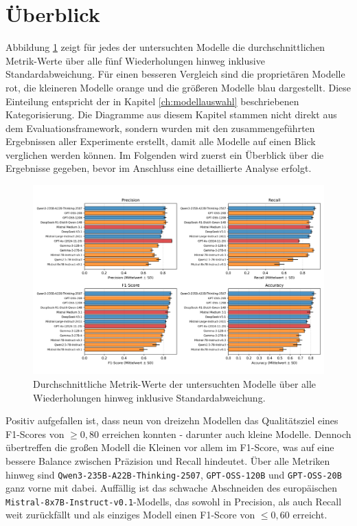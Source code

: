 \section{Überblick}\label{sec:analyse}

Abbildung \ref{fig:results-evaluation-metrics-comparison} zeigt für jedes der untersuchten Modelle die durchschnittlichen Metrik-Werte über alle fünf Wiederholungen hinweg inklusive Standardabweichung. Für einen besseren Vergleich sind die proprietären Modelle rot, die kleineren Modelle orange und die größeren Modelle blau dargestellt. Diese Einteilung entspricht der in Kapitel \ref{ch:modellauswahl} beschriebenen Kategorisierung. Die Diagramme aus diesem Kapitel stammen nicht direkt aus dem Evaluationsframework, sondern wurden mit den zusammengeführten Ergebnissen aller Experimente erstellt, damit alle Modelle auf einen Blick verglichen werden können. Im Folgenden wird zuerst ein Überblick über die Ergebnisse gegeben, bevor im Anschluss eine detaillierte Analyse erfolgt.

\begin{figure}[htbp]
    \centering
    \includegraphics[width=\textwidth,trim=20 40 20 10]{images/results/evaluation_metrics_comparison}
    \caption{Durchschnittliche Metrik-Werte der untersuchten Modelle über alle Wiederholungen hinweg inklusive Standardabweichung.}
    \label{fig:results-evaluation-metrics-comparison}
\end{figure}

Positiv aufgefallen ist, dass neun von dreizehn Modellen das Qualitätsziel eines F1-Scores von $\geq 0{,}80$ erreichen konnten - darunter auch kleine Modelle. Dennoch übertreffen die großen Modell die Kleinen vor allem im F1-Score, was auf eine bessere Balance zwischen Präzision und Recall hindeutet. Über alle Metriken hinweg sind \texttt{Qwen3-235B-A22B-Thinking-2507}, \texttt{GPT-OSS-120B} und \texttt{GPT-OSS-20B} ganz vorne mit dabei. Auffällig ist das schwache Abschneiden des europäischen \texttt{Mistral-8x7B-Instruct-v0.1}-Modells, das sowohl in Precision, als auch Recall weit zurückfällt und als einziges Modell einen F1-Score von $\le 0{,}60$ erreicht.

